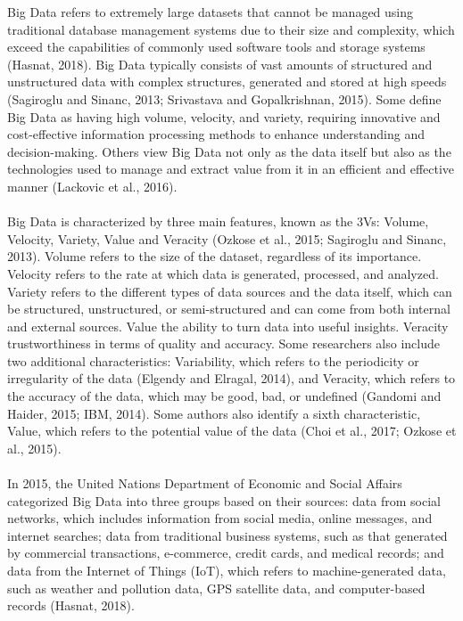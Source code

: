 Big Data refers to extremely large datasets that cannot be managed using traditional database management systems due
to their size and complexity, which exceed the capabilities of commonly used software tools and storage systems
(Hasnat, 2018). Big Data typically consists of vast amounts of structured and unstructured data with complex
structures, generated and stored at high speeds (Sagiroglu and Sinanc, 2013; Srivastava and Gopalkrishnan, 2015).
Some define Big Data as having high volume, velocity, and variety, requiring innovative and cost-effective
information processing methods to enhance understanding and decision-making. Others view Big Data not only
as the data itself but also as the technologies used to manage and extract value from it in an efficient
and effective manner (Lackovic et al., 2016).\\\\
Big Data is characterized by three main features, known as the 3Vs: Volume, Velocity, Variety, Value and Veracity
(Ozkose et al., 2015; Sagiroglu and Sinanc, 2013). Volume refers to the size of the dataset, regardless of its
importance. Velocity refers to the rate at which data is generated, processed, and analyzed. Variety refers to
the different types of data sources and the data itself, which can be structured, unstructured, or semi-structured
and can come from both internal and external sources. Value the ability to turn data into useful insights.
Veracity trustworthiness in terms of quality and accuracy. Some researchers also include two additional
characteristics: Variability, which refers to the periodicity or irregularity of the data
(Elgendy and Elragal, 2014), and Veracity, which refers to the accuracy of the data, which may be good, bad,
or undefined (Gandomi and Haider, 2015; IBM, 2014). Some authors also identify a sixth characteristic,
Value, which refers to the potential value of the data (Choi et al., 2017; Ozkose et al., 2015).\\\\
In 2015, the United Nations Department of Economic and Social Affairs categorized Big Data into three groups based
on their sources: data from social networks, which includes information from social media, online messages, and
internet searches; data from traditional business systems, such as that generated by commercial transactions,
e-commerce, credit cards, and medical records; and data from the Internet of Things (IoT), which refers
to machine-generated data, such as weather and pollution data, GPS satellite data, and computer-based records
(Hasnat, 2018).\\\\
